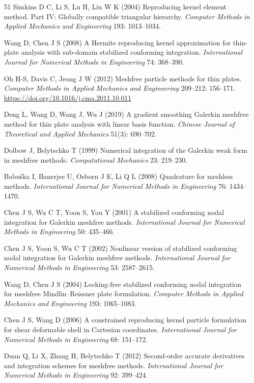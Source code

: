 \begin{thebibliography}{51}
 Simkins D C, Li S, Lu H, Liu W K (2004) Reproducing kernel element method. {Part IV}: Globally compatible triangular hierarchy. \emph{Computer Methods in Applied Mechanics and Engineering} 193: 1013--1034.

 Wang D, Chen J S (2008) A {Hermite} reproducing kernel approximation for thin-plate analysis with sub-domain stabilized conforming integration. \emph{International Journal for Numerical Methods in Engineering} 74: 368--390.

 Oh H-S, Davis C, Jeong J W (2012) Meshfree particle methods for thin plates. \emph{Computer Methods in Applied Mechanics and Engineering} 209--212: 156--171. \url{https://doi.org/10.1016/j.cma.2011.10.011}

 Deng L, Wang D, Wang J, Wu J (2019) A gradient smoothing {Galerkin} meshfree method for thin plate analysis with linear basis function. \emph{Chinese Journal of Theoretical and Applied Mechanics} 51(3): 690--702.

 Dolbow J, Belytschko T (1999) Numerical integration of the {Galerkin} weak form in meshfree methods. \emph{Computational Mechanics} 23: 219--230.

 Babu{\v{s}}ka I, Banerjee U, Osborn J E, Li Q L (2008) Quadrature for meshless methods. \emph{International Journal for Numerical Methods in Engineering} 76: 1434--1470.

 Chen J S, Wu C T, Yoon S, You Y (2001) A stabilized conforming nodal integration for {Galerkin} meshfree methods. \emph{International Journal for Numerical Methods in Engineering} 50: 435--466.

 Chen J S, Yoon S, Wu C T (2002) Nonlinear version of stabilized conforming nodal integration for {Galerkin} meshfree methods. \emph{International Journal for Numerical Methods in Engineering} 53: 2587--2615.

 Wang D, Chen J S (2004) Locking-free stabilized conforming nodal integration for meshfree {Mindlin--Reissner} plate formulation. \emph{Computer Methods in Applied Mechanics and Engineering} 193: 1065--1083.

 Chen J S, Wang D (2006) A constrained reproducing kernel particle formulation for shear deformable shell in {Cartesian} coordinates. \emph{International Journal for Numerical Methods in Engineering} 68: 151--172.

 Duan Q, Li X, Zhang H, Belytschko T (2012) Second-order accurate derivatives and integration schemes for meshfree methods. \emph{International Journal for Numerical Methods in Engineering} 92: 399--424.


\end{thebibliography}
